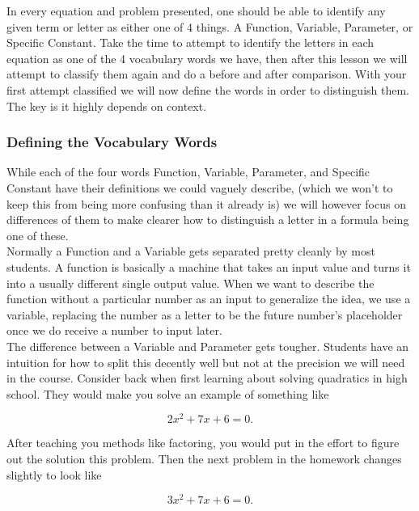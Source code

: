 \documentclass[12pt]{article}
\begin{document}
In every equation and problem presented, one should be able to identify any given term or letter as either one of 4 things. A Function, Variable, Parameter, or Specific Constant. Take the time to attempt to identify the letters in each equation as one of the 4 vocabulary words we have, then after this lesson we will attempt to classify them again and do a before and after comparison. With your first attempt classified we will now define the words in order to distinguish them. The key is it highly depends on context. 

\subsubsection{Defining the Vocabulary Words}

While each of the four words Function, Variable, Parameter, and Specific Constant have their definitions we could vaguely describe, (which we won't to keep this from being more confusing than it already is) we will however focus on differences of them to make clearer how to distinguish a letter in a formula being one of these. \\

Normally a Function and a Variable gets separated pretty cleanly by most students. A function is basically a machine that takes an input value and turns it into a usually different single output value. When we want to describe the function without a particular number as an input to generalize the idea, we use a variable, replacing the number as a letter to be the future number's placeholder once we do receive a number to input later. \\

The difference between a Variable and Parameter gets tougher. Students have an intuition for how to split this decently well but not at the precision we will need in the course. Consider back when first learning about solving quadratics in high school. They would make you solve an example of something like

\begin{equation*}
    2x^2+7x+6=0.
\end{equation*}

After teaching you methods like factoring, you would put in the effort to figure out the solution this problem. Then the next problem in the homework changes slightly to look like

\begin{equation*}
    3x^2+7x+6=0.
\end{equation*}
\end{document}
